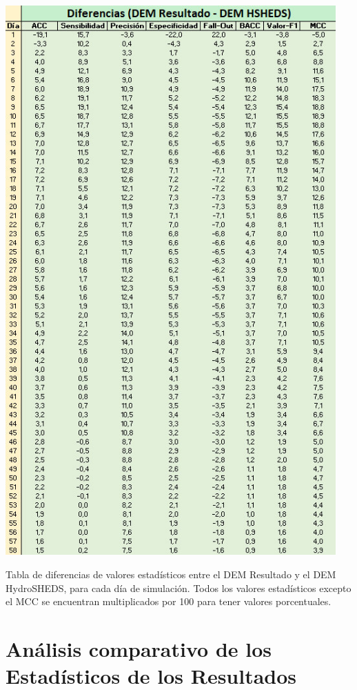 \documentclass[10pt,a4paper, twoside]{report}
\begin{document}
\begin{table}[H]
   \centering      
   \includegraphics[width=0.95\textwidth]{imagenes/TablaDiferencias2.jpg}
 \caption{Tabla de diferencias de valores estadísticos entre el DEM Resultado y el DEM HydroSHEDS, para cada día de simulación. Todos los valores estadísticos excepto el MCC se encuentran multiplicados por 100 para tener valores porcentuales.}
 \label{TablaDiferencias}
\end{table}


\section{Análisis comparativo de los Estadísticos de los Resultados}
\end{document}
